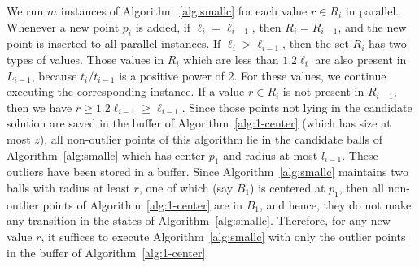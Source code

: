 \documentclass[envcountsame]{cls/cccg15}
\renewcommand{\O}{\ensuremath{{O}}}
\newcommand{\gee}{\geqslant}
\renewcommand{\ge}{\gee}
\newcommand{\eps}{\varepsilon}
\begin{document}
We run $m$ instances of Algorithm~\ref{alg:smallc} for each value $r \in R_i$ in parallel. 
Whenever a new point $p_i$ is added, 
if $\ell_i=\ell_{i-1}$, then $R_i = R_{i-1}$,
and the new point is inserted to all parallel instances. %
If $\ell_i > \ell_{i-1}$, then the set $R_i$ has two types of values.
Those values in $R_i$ which are less than $1.2\ell_i$ are also present in $L_{i-1}$,
because $t_i / t_{i-1}$ is a positive power of 2.
For these values, we continue executing the corresponding instance.
If a value $r \in R_i$ is not present in $R_{i-1}$, 
then we have $r \ge 1.2 \ell_{i - 1} \ge \ell_{i-1}$.
Since those points not lying in the candidate solution 
are saved in the buffer of Algorithm~\ref{alg:1-center} (which has size at most $z$), 
all non-outlier points of this algorithm lie in the candidate balls of Algorithm~\ref{alg:smallc} which has center $p_1$ and radius at most $l_{i-1}$. 
These outliers have been stored in a buffer. 
Since Algorithm~\ref{alg:smallc} maintains two balls with radius at least $r$, 
one of which (say $B_1$) is centered at $p_1$, 
then all non-outlier points of Algorithm~\ref{alg:1-center} are in $B_1$,
and hence, they do not make any transition in the states of Algorithm~\ref{alg:smallc}.
Therefore, for any new value $r$, 
it suffices to execute Algorithm~\ref{alg:smallc} with only the 
outlier points in the buffer of Algorithm~\ref{alg:1-center}.



\end{document}
